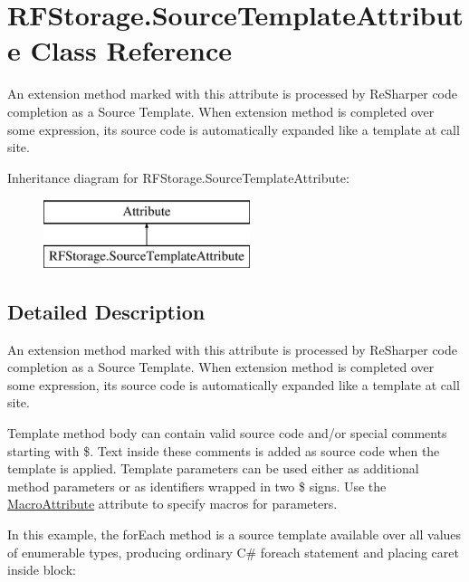 \hypertarget{class_r_f_storage_1_1_source_template_attribute}{}\section{R\+F\+Storage.\+Source\+Template\+Attribute Class Reference}
\label{class_r_f_storage_1_1_source_template_attribute}


An extension method marked with this attribute is processed by Re\+Sharper code completion as a \textquotesingle{}Source Template\textquotesingle{}. When extension method is completed over some expression, it\textquotesingle{}s source code is automatically expanded like a template at call site.  


Inheritance diagram for R\+F\+Storage.\+Source\+Template\+Attribute\+:\begin{figure}[H]
\begin{center}
\leavevmode
\includegraphics[height=2.000000cm]{class_r_f_storage_1_1_source_template_attribute}
\end{center}
\end{figure}


\subsection{Detailed Description}
An extension method marked with this attribute is processed by Re\+Sharper code completion as a \textquotesingle{}Source Template\textquotesingle{}. When extension method is completed over some expression, it\textquotesingle{}s source code is automatically expanded like a template at call site. 

Template method body can contain valid source code and/or special comments starting with \textquotesingle{}\$\textquotesingle{}. Text inside these comments is added as source code when the template is applied. Template parameters can be used either as additional method parameters or as identifiers wrapped in two \textquotesingle{}\$\textquotesingle{} signs. Use the \mbox{\hyperlink{class_r_f_storage_1_1_macro_attribute}{Macro\+Attribute}} attribute to specify macros for parameters. 

In this example, the \textquotesingle{}for\+Each\textquotesingle{} method is a source template available over all values of enumerable types, producing ordinary C\# \textquotesingle{}foreach\textquotesingle{} statement and placing caret inside block\+: 
\begin{DoxyCode}{0}
\DoxyCodeLine{[SourceTemplate]}
\DoxyCodeLine{     \textcolor{comment}{//\$ \$END\$}}
\DoxyCodeLine{  \}}
\DoxyCodeLine{\}}
\end{DoxyCode}
 

